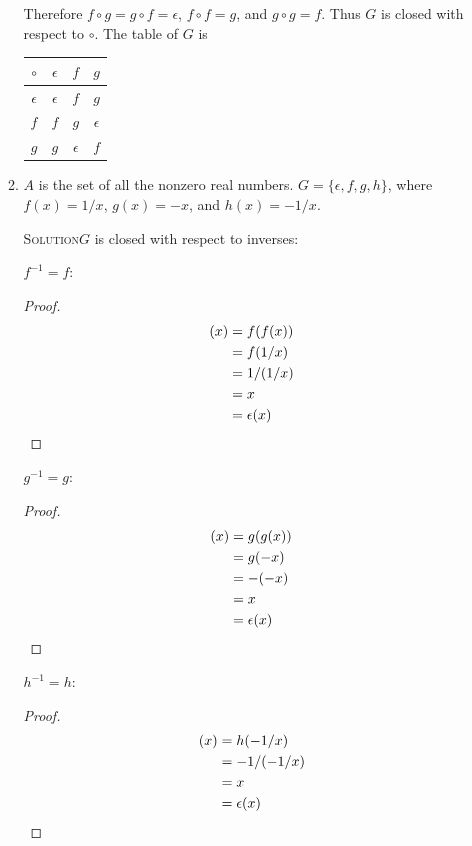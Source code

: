 \documentclass[twoside]{amsart}
\newcommand{\solution}{\textsc{Solution}\xspace}
\begin{document}
\begin{enumerate}[A.]
\begin{enumerate}[1]
      Therefore $f \circ g = g \circ f = \epsilon$, $f \circ f = g$,
      and $g \circ g = f$. Thus $G$ is
      closed with respect to $\circ$. The table of $G$ is
      \begin{center}
      \begin{tabular}{c|ccc}
         $\circ$ & $\epsilon$ & $f$ & $g$ \\ \hline
      $\epsilon$ & $\epsilon$ & $f$ & $g$ \\
             $f$ & $f$ & $g$ & $\epsilon$ \\
	     $g$ & $g$ & $\epsilon$ & $f$
      \end{tabular}
      \end{center}

      \item $A$ is the set of all the nonzero real numbers. $G = \{
      \epsilon, f, g, h\}$, where $f(x)=1/x$, $g(x)=-x$, and $h(x)=-1/x$.

      \solution $G$ is closed with respect to inverses:

      $f^{-1}=f$: 
      \begin{proof}
	 \begin{align*}
	    [f \circ f](x) &= f(f(x)) \\
	                   &= f(1/x) \\
			   &= 1/(1/x) \\
			   &= x \\
			   &= \epsilon(x) \qedhere
	 \end{align*}
      \end{proof}

      $g^{-1}=g$: 
      \begin{proof}
	 \begin{align*}
	    [g \circ g](x) &= g(g(x)) \\
	                   &= g(-x) \\
			   &= -(-x) \\
			   &= x \\
			   &= \epsilon(x) \qedhere
	 \end{align*}
      \end{proof}

      $h^{-1}=h$: 
      \begin{proof}
	 \begin{align*}
	    [h \circ h](x) &= h(-1/x) \\
	                   &= -1/(-1/x) \\
			   &= x \\
			   &= \epsilon(x) \qedhere
	 \end{align*}
      \end{proof}


\end{enumerate}
\end{enumerate}
\end{document}
